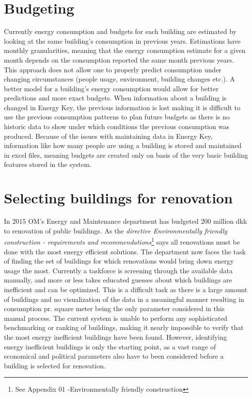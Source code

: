  \section*{Budgeting}
 Currently energy consumption and budgets for each building are estimated by looking at the same building’s consumption in previous years. Estimations have monthly granularities, meaning that the energy consumption estimate for a given month depends on the consumption reported the same month previous years. This approach does not allow one to properly predict consumption under changing circumstances (people usage, environment, building changes etc.). A better model for a building’s energy consumption would allow for better predictions and more exact budgets. When information about a building is changed in Energy Key, the previous information is lost making it is difficult to use the previous consumption patterns to plan future budgets as there is no historic data to show under which conditions the previous consumption was produced. Because of the issues with maintaining data in Energy Key, information like how many people are using a building is stored and maintained in excel files, meaning budgets are created only on basis of the very basic building features stored in the system.
 \section*{Selecting buildings for renovation}
 In 2015 OM’s Energy and Maintenance department has budgeted 200 million dkk to renovation of public buildings. As the \emph{directive Environmentally friendly construction - requirements and recommendations}\footnote{See Appendix 01 -Environmentally friendly construction} says all renovations must be done with the most energy efficient solutions. The department now faces the task of finding the set of buildings for which renovations would bring down energy usage the most. Currently a taskforce is screening through the available data manually, and more or less takes educated guesses about which buildings are inefficient and can be optimized. This is a difficult task as there is a large amount of buildings and no visualization of the data in a meaningful manner resulting in consumption pr. square meter being the only parameter considered in this manual process. The current system is unable to perform any sophisticated benchmarking or ranking of buildings, making it nearly impossible to verify that the most energy inefficient buildings have been found. However, identifying energy inefficient buildings is only the starting point, as a vast range of economical and political parameters also have to been considered before a building is selected for renovation.